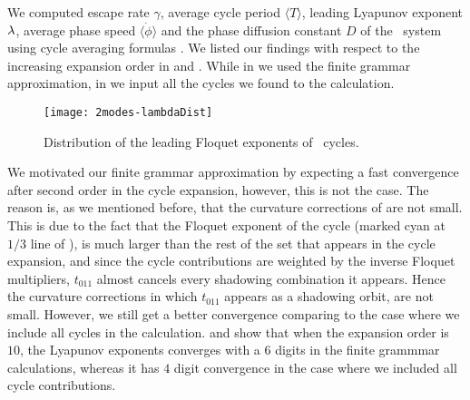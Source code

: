 {{{%

We computed escape rate $\gamma$, average cycle period $\langle T \rangle$, 
leading Lyapunov exponent $\lambda$, average phase speed $\langle \dot{\phi} \rangle$ 
and the phase diffusion constant $D$ of the \twomode\ system using cycle 
averaging formulas . We listed our 
findings with respect to the increasing expansion order in  
and . While in  
we used the finite grammar approximation, in  
we input all the cycles we found to the calculation.




\begin{figure}%
\centering
 \texttt{[image: 2modes-lambdaDist]}
\caption{Distribution of the leading Floquet exponents of \twomode\ cycles.}
\label{f-2modes-lambdaDist}
\end{figure}

We motivated our finite grammar approximation by expecting a fast convergence
after second order in the cycle expansion, however, this is not the case. The 
reason is, as we mentioned before, that the curvature corrections of
 are not small. This is due to the fact 
that the Floquet exponent of the cycle  (marked cyan at $1/3$ 
line of ), is much larger than the rest of the 
set that appears in the cycle expansion, and since the cycle contributions 
are weighted by the inverse Floquet multipliers, $t_{011}$ almost cancels 
every shadowing combination it appears. Hence the curvature corrections in
which $t_{011}$ appears as a shadowing orbit, are not small. However, we 
still get a better convergence comparing to the case where we include 
all cycles in the calculation.  and 
 show that when the expansion order 
is $10$, the Lyapunov exponents converges with a $6$ digits in the finite 
grammmar calculations, whereas it has $4$ digit convergence in the case 
where we included all cycle contributions.

}}}
